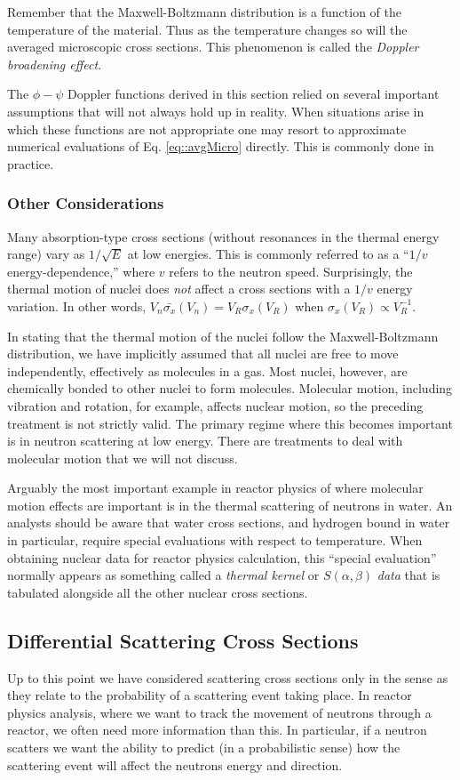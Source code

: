 \documentclass[11pt]{article}
\begin{document}
Remember that the Maxwell-Boltzmann distribution is a function of the temperature of the material.  Thus as the temperature changes so will the averaged microscopic cross sections.  This phenomenon is called the \emph{Doppler broadening effect}.

The \(\phi-\psi\) Doppler functions derived in this section relied on several important assumptions that will not always hold up in reality.  When situations arise in which these functions are not appropriate one may resort to approximate numerical evaluations of Eq. \ref{eq::avgMicro} directly.  This is commonly done in practice.
\subsubsection{Other Considerations}
\label{sec:orgheadline21}
Many absorption-type cross sections (without resonances in the thermal energy range) vary as \(1/\sqrt{E}\) at low energies.  This is commonly referred to as a ``\(1/v\) energy-dependence,'' where \(v\) refers to the neutron speed.  Surprisingly, the thermal motion of nuclei does \emph{not} affect a cross sections with a \(1/v\) energy variation.  In other words, \(V_n \bar{\sigma_x}(V_n) = V_R\sigma_x(V_R)\) when \(\sigma_x(V_R) \propto V_R^{-1}\).

In stating that the thermal motion of the nuclei follow the Maxwell-Boltzmann distribution, we have implicitly assumed that all nuclei are free to move independently, effectively as molecules in a gas.  Most nuclei, however, are chemically bonded to other nuclei to form molecules.  Molecular motion, including vibration and rotation, for example, affects nuclear motion, so the preceding treatment is not strictly valid.  The primary regime where this becomes important is in neutron scattering at low energy. There are treatments to deal with molecular motion that we will not discuss.  

Arguably the most important example in reactor physics of where molecular motion effects are important is in the thermal scattering of neutrons in water.  An analysts should be aware that water cross sections, and hydrogen bound in water in particular, require special evaluations with respect to temperature.  When obtaining nuclear data for reactor physics calculation, this ``special evaluation'' normally appears as something called a \emph{thermal kernel} or \(S(\alpha,\beta)\) \emph{data} that is tabulated alongside all the other nuclear cross sections.
\subsection{Differential Scattering Cross Sections}
\label{sec:orgheadline23}
Up to this point we have considered scattering cross sections only in the sense as they relate to the probability of a scattering event taking place.  In reactor physics analysis, where we want to track the movement of neutrons through a reactor, we often need more information than this.  In particular, if a neutron scatters we want the ability to predict (in a probabilistic sense) how the scattering event will affect the neutrons energy and direction.
\end{document}
